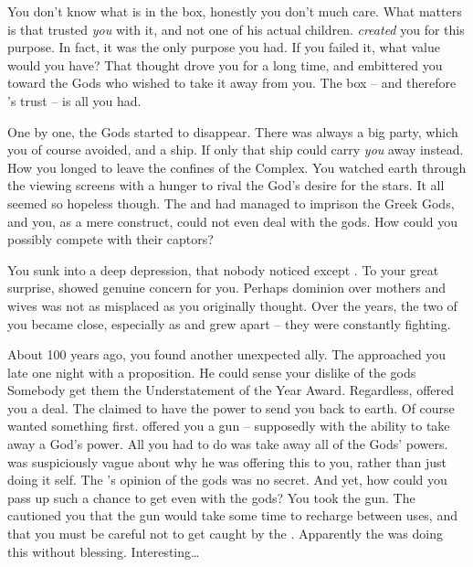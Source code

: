 \documentclass[char]{guardians}
\begin{document}
You don't know what is in the box, honestly you don't much care. What matters is that \cZeus{} trusted \emph{you} with it, and not one of his actual children. \cZeus{\They} \emph{created} you for this purpose. In fact, it was the only purpose you had. If you failed it, what value would you have? That thought drove you for a long time, and embittered you toward the Gods who wished to take it away from you. The box -- and therefore \cZeus{}'s trust -- is all you had.

One by one, the Gods started to disappear. There was always a big party, which you of course avoided, and a ship. If only that ship could carry \emph{you} away instead. How you longed to leave the confines of the Complex. You watched earth through the viewing screens with a hunger to rival the God's desire for the stars. It all seemed so hopeless though.  The \cWarden{} and \cCaretaker{} had managed to imprison the Greek Gods, and you, as a mere construct, could not even deal with the gods. How could you possibly compete with their captors?

You sunk into a deep depression, that nobody noticed except \cHera{}. To your great surprise, \cHera{\they} showed genuine concern for you. Perhaps \cHera{\them} dominion over mothers and wives was not as misplaced as you originally thought. Over the years, the two of you became close, especially as \cHera{} and \cAthena{} grew apart -- they were constantly fighting.


About 100 years ago, you found another unexpected ally. The \cWarden{} approached you late one night with a proposition. He could sense your dislike of the gods Somebody get \cWarden{\them} them the Understatement of the Year Award. Regardless, \cWarden{\They} offered you a deal. The \cWarden{} claimed to have the power to send you back to earth. Of course \cWarden{\they} wanted something first. \cWarden{} offered you a gun -- supposedly with the ability to take away a God's power.  All you had to do was take away all of the Gods' powers. \cWarden{\They} was suspiciously vague about why he was offering this to you, rather than just doing it \cWarden{\them}self. The \cWarden{}'s opinion of the gods was no secret. And yet, how could you pass up such a chance to get even with the gods? You took the gun. The \cWarden{} cautioned you that the gun would take some time to recharge between uses, and that you must be careful not to get caught by the \cCaretaker{}. Apparently the \cWarden{} was doing this without \cCaretaker{\them} blessing. Interesting\ldots{}
\end{document}
